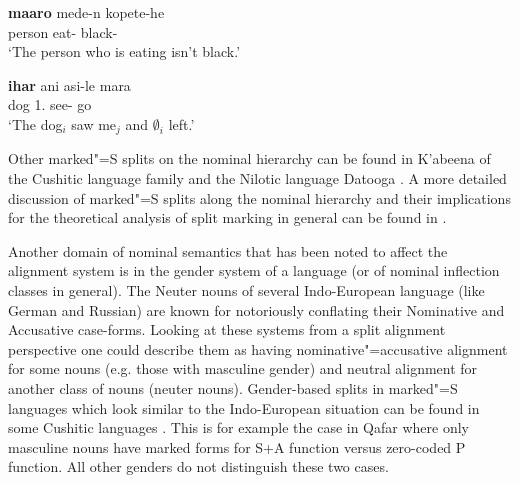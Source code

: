 \begin{exe}\ex\label{OirFullN}
\begin{xlist}
\ex\gll \textbf{maaro} mede-n kopete-he\\
person eat-\relativ{} black-\Neg{}\\
\glt `The person who is eating isn't black.'

\ex\gll \textbf{ihar} ani asi-le mara\\
dog 1\sg{}.\acc{} see-\ssbj{} go\\
\glt `The dog$_i$ saw me$_j$ and $\emptyset _i$ left.'
\end{xlist}\end{exe}

Other marked"=S splits on the nominal hierarchy can be found in K'abeena of the Cushitic language family \citep{Crass:2005} and the Nilotic language Datooga \citep{Kiessling:2007}. 
A more detailed discussion of marked"=S splits along the nominal hierarchy and their implications for the theoretical analysis of split marking in general can be found in \citet{Handschuh:2008, Handschuh:2014}. 

Another domain of nominal semantics that has been noted to affect the alignment system is in the gender system of a language (or of nominal inflection classes in general). 
The Neuter nouns of several Indo-European language (like German and Russian) are known for notoriously conflating their Nominative and Accusative case-forms. 
Looking at these systems from a split alignment perspective one could describe them as having nominative"=accusative alignment for some nouns (e.g. those with masculine gender) and neutral alignment for another class of nouns (neuter nouns).  
Gender-based splits in marked"=S languages which look similar to the Indo-European situation can be found in some Cushitic languages \citep{Sasse:1984}. 
This is for example the case in Qafar \citep{Hayward:1998} where only masculine nouns have marked forms for S+A function versus zero-coded P function. 
All other genders do not distinguish these two cases.

